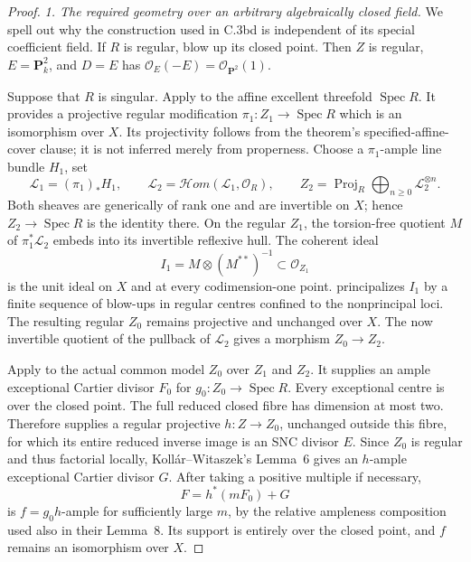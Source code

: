 \begin{proof}
\emph{1. The required geometry over an arbitrary algebraically closed field.}
We spell out why the construction used in C.3bd is independent of
its special coefficient field. If $R$ is regular, blow up its closed
point. Then $Z$ is regular, $E=\mathbf P^2_k$, and $D=E$ has
$\mathcal O_E(-E)=\mathcal O_{\mathbf P^2}(1)$.

Suppose that $R$ is singular. Apply
\citet[Theorem 1.1, author pp.~3--4]{frC3bdCossartPiltant2019}
to the affine excellent threefold $\operatorname{Spec}R$.
It provides a projective regular modification
$\pi_1:Z_1\to\operatorname{Spec}R$ which is an isomorphism over
$X$. Its projectivity follows from the theorem's specified-affine-cover
clause; it is not inferred merely from properness. Choose a
$\pi_1$-ample line bundle $H_1$, set
\[
 \mathcal L_1=(\pi_1)_*H_1,
 \qquad\mathcal L_2=\mathcal Hom(\mathcal L_1,\mathcal O_R),
 \qquad Z_2=\operatorname{Proj}_R
                 \bigoplus_{n\ge0}\mathcal L_2^{\otimes n}.
\]
Both sheaves are generically of rank one and are invertible on
$X$; hence $Z_2\to\operatorname{Spec}R$ is the identity there.
On the regular $Z_1$, the torsion-free quotient $M$ of
$\pi_1^*\mathcal L_2$ embeds into its invertible reflexive hull.
The coherent ideal
\[
                 I_1=M\otimes(M^{**})^{-1}\subset\mathcal O_{Z_1}
\]
is the unit ideal on $X$ and at every codimension-one point.
\citet[Proposition 4.4 and its proof, author p.~141]
{frC3bdCossartPiltant2019} principalizes $I_1$ by a finite sequence
of blow-ups in regular centres confined to the nonprincipal loci.
The resulting regular $Z_0$ remains projective and unchanged over
$X$. The now invertible quotient of the pullback of $\mathcal L_2$
gives a morphism $Z_0\to Z_2$.

Apply \citet[Lemma 8 and its proof, author pp.~2--3]
{frC3bdKollarWitaszek2026} to the actual common model $Z_0$ over
$Z_1$ and $Z_2$. It supplies an ample exceptional Cartier divisor
$F_0$ for $g_0:Z_0\to\operatorname{Spec}R$.
Every exceptional centre is over the closed point. The full reduced
closed fibre has dimension at most two. Therefore
\citet[Corollary 0.4 and its proof, author p.~5]
{frC3bdCossartJannsenSaito2013} supplies a regular projective
$h:Z\to Z_0$, unchanged outside this fibre, for which its entire
reduced inverse image is an SNC divisor $E$.
Since $Z_0$ is regular and thus factorial locally,
Koll\'ar--Witaszek's Lemma~6 gives an $h$-ample exceptional
Cartier divisor $G$. After taking a positive multiple if necessary,
\[
                         F=h^*(mF_0)+G
\]
is $f=g_0h$-ample for sufficiently large $m$, by the relative
ampleness composition used also in their Lemma~8. Its support
is entirely over the closed point, and $f$ remains an isomorphism
over $X$.


\end{proof}

